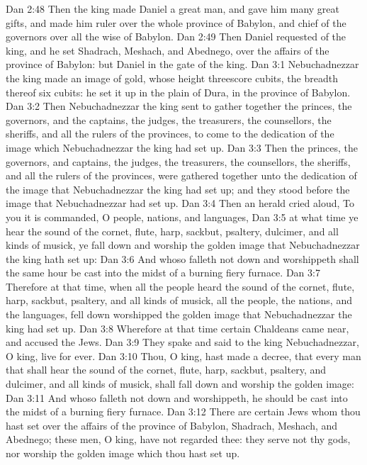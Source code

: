 \vs Dan 2:48 Then the king made Daniel a great man, and gave him many great gifts, and made him ruler over the whole province of Babylon, and chief of the governors over all the wise  of Babylon.
\vs Dan 2:49 Then Daniel requested of the king, and he set Shadrach, Meshach, and Abednego, over the affairs of the province of Babylon: but Daniel  in the gate of the king.
\vs Dan 3:1 Nebuchadnezzar the king made an image of gold, whose height  threescore cubits,  the breadth thereof six cubits: he set it up in the plain of Dura, in the province of Babylon.
\vs Dan 3:2 Then Nebuchadnezzar the king sent to gather together the princes, the governors, and the captains, the judges, the treasurers, the counsellors, the sheriffs, and all the rulers of the provinces, to come to the dedication of the image which Nebuchadnezzar the king had set up.
\vs Dan 3:3 Then the princes, the governors, and captains, the judges, the treasurers, the counsellors, the sheriffs, and all the rulers of the provinces, were gathered together unto the dedication of the image that Nebuchadnezzar the king had set up; and they stood before the image that Nebuchadnezzar had set up.
\vs Dan 3:4 Then an herald cried aloud, To you it is commanded, O people, nations, and languages,
\vs Dan 3:5  at what time ye hear the sound of the cornet, flute, harp, sackbut, psaltery, dulcimer, and all kinds of musick, ye fall down and worship the golden image that Nebuchadnezzar the king hath set up:
\vs Dan 3:6 And whoso falleth not down and worshippeth shall the same hour be cast into the midst of a burning fiery furnace.
\vs Dan 3:7 Therefore at that time, when all the people heard the sound of the cornet, flute, harp, sackbut, psaltery, and all kinds of musick, all the people, the nations, and the languages, fell down  worshipped the golden image that Nebuchadnezzar the king had set up.
\vs Dan 3:8 Wherefore at that time certain Chaldeans came near, and accused the Jews.
\vs Dan 3:9 They spake and said to the king Nebuchadnezzar, O king, live for ever.
\vs Dan 3:10 Thou, O king, hast made a decree, that every man that shall hear the sound of the cornet, flute, harp, sackbut, psaltery, and dulcimer, and all kinds of musick, shall fall down and worship the golden image:
\vs Dan 3:11 And whoso falleth not down and worshippeth,  he should be cast into the midst of a burning fiery furnace.
\vs Dan 3:12 There are certain Jews whom thou hast set over the affairs of the province of Babylon, Shadrach, Meshach, and Abednego; these men, O king, have not regarded thee: they serve not thy gods, nor worship the golden image which thou hast set up.
